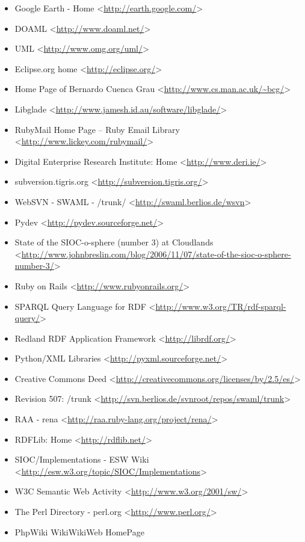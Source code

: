 \begin{itemize}
 \item Google Earth - Home
 <\url{http://earth.google.com/}>
 \item DOAML
 <\url{http://www.doaml.net/}>
 \item UML
 <\url{http://www.omg.org/uml/}>
 \item Eclipse.org home
 <\url{http://eclipse.org/}>
 \item Home Page of Bernardo Cuenca Grau
 <\url{http://www.cs.man.ac.uk/~bcg/}>
 \item Libglade
 <\url{http://www.jamesh.id.au/software/libglade/}>
 \item RubyMail Home Page -- Ruby Email Library
 <\url{http://www.lickey.com/rubymail/}>
 \item Digital Enterprise Research Institute: Home
 <\url{http://www.deri.ie/}>
 \item subversion.tigris.org
 <\url{http://subversion.tigris.org/}>
 \item WebSVN - SWAML - /trunk/
 <\url{http://swaml.berlios.de/wsvn}>
 \item Pydev
 <\url{http://pydev.sourceforge.net/}>
 \item State of the SIOC-o-sphere (number 3) at Cloudlands
 <\url{http://www.johnbreslin.com/blog/2006/11/07/state-of-the-sioc-o-sphere-number-3/}>
 \item Ruby on Rails
 <\url{http://www.rubyonrails.org/}>
 \item SPARQL Query Language for RDF
 <\url{http://www.w3.org/TR/rdf-sparql-query/}>
 \item Redland RDF Application Framework
 <\url{http://librdf.org/}>
 \item Python/XML Libraries
 <\url{http://pyxml.sourceforge.net/}>
 \item Creative Commons Deed
 <\url{http://creativecommons.org/licenses/by/2.5/es/}>
 \item Revision 507: /trunk
 <\url{http://svn.berlios.de/svnroot/repos/swaml/trunk}>
 \item RAA - rena
 <\url{http://raa.ruby-lang.org/project/rena/}>
 \item RDFLib: Home
 <\url{http://rdflib.net/}>
 \item SIOC/Implementations - ESW Wiki
 <\url{http://esw.w3.org/topic/SIOC/Implementations}>
 \item W3C Semantic Web Activity
 <\url{http://www.w3.org/2001/sw/}>
 \item The Perl Directory - perl.org
 <\url{http://www.perl.org/}>
 \item PhpWiki WikiWikiWeb HomePage

\end{itemize}
